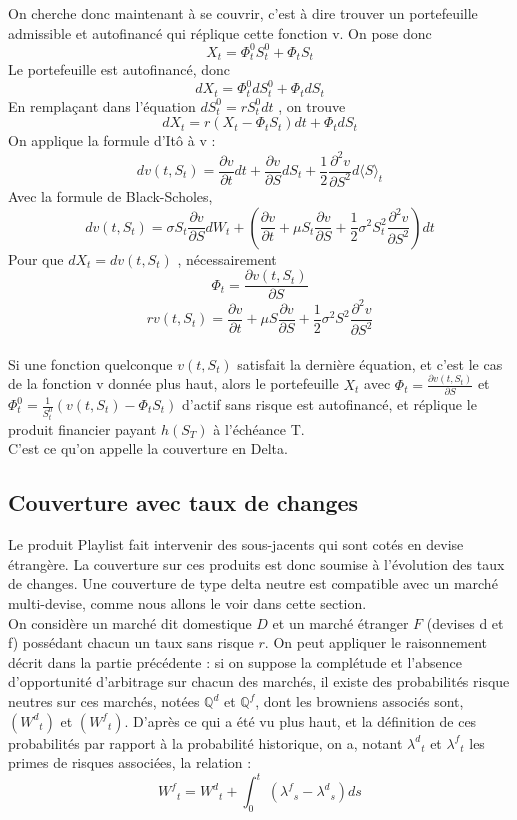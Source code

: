 \documentclass[french,12pt,a4paper]{article}
\begin{document}
\\ \\
On cherche donc maintenant à se couvrir, c'est à dire trouver un portefeuille admissible et autofinancé qui réplique cette fonction v. On pose donc
$$ X_t = \Phi_{t}^0 S_{t}^0  + \Phi_t S_{t}  $$
Le portefeuille est autofinancé, donc
$$ dX_t = \Phi_{t}^0 dS_{t}^0  + \Phi_t dS_{t} $$
En remplaçant dans l'équation $ dS_{t}^0 = r S_{t}^0 dt $ , on trouve
$$ dX_t = r(X_t - \Phi_t S_{t} )dt + \Phi_t dS_{t}  $$
On applique la formule d'Itô à v :
$$ dv(t,S_t) = \frac{\partial v}{\partial t}dt + \frac{\partial v}{\partial S}dS_t + \frac{1}{2} \frac{\partial^2 v}{\partial S^2} d \langle S \rangle_t   $$
Avec la formule de Black-Scholes,
$$ dv(t,S_t) = \sigma S_t \frac{\partial v}{\partial S} dW_t + \left (  \frac{\partial v}{\partial t} + \mu S_t   \frac{\partial v}{\partial S} +  \frac{1}{2} \sigma^2 S_{t}^2 \frac{\partial^2 v}{\partial S^2} \right ) dt	$$
Pour que $ dX_t = dv(t,S_t) $ , nécessairement
$$ \Phi_t = \frac{\partial v(t,S_t)}{\partial S} $$
$$ rv(t,S_t) = \frac{\partial v}{\partial t} + \mu S  \frac{\partial v}{\partial S} +  \frac{1}{2} \sigma^2 S^2 \frac{\partial^2 v}{\partial S^2} $$ \\
Si une fonction quelconque $ v(t,S_t) $ satisfait la dernière équation, et c'est le cas de la fonction v donnée plus haut, alors le portefeuille $ X_t $ avec $ \Phi_t = \frac{\partial v(t,S_t)}{\partial S} $ et $ \Phi_{t}^0  = \frac{1}{S_{t}^0} (v(t,S_t) - \Phi_t S_t )$ d'actif sans risque est autofinancé, et réplique le produit financier payant $ h(S_T) $ à l'échéance T.  \\
C'est ce qu'on appelle la couverture en Delta.

\subsection{Couverture avec taux de changes}

Le produit Playlist fait intervenir des sous-jacents qui sont cotés en devise étrangère. La couverture sur ces produits est donc soumise à l'évolution des taux de changes.
Une couverture de type delta neutre est compatible avec un marché multi-devise, comme nous allons le voir dans cette section.
\\
On considère un marché dit domestique $D$ et un marché étranger $F$ (devises d et f) possédant chacun un taux sans risque $r$. On peut appliquer le raisonnement décrit dans la partie précédente : si on suppose la complétude et l'absence d'opportunité d'arbitrage sur chacun des marchés, il existe des probabilités risque neutres sur ces marchés, notées $\mathbb{Q}^{d}$ et $\mathbb{Q}^{f}$, dont les browniens associés sont, $({W^{d}}_{t})$ et $({W^{f}}_{t})$.
D'après ce qui a été vu plus haut,  et la définition de ces probabilités par rapport à la probabilité historique, on a, notant ${\lambda^{d}}_{t}$ et ${\lambda^{f}}_{t}$ les primes de risques associées, la relation :
$${W^{f}}_{t} = {W^{d}}_{t} +  \int_{0}^t \ ({\lambda^{f}}_{s} - {\lambda^{d}}_{s}) ds   $$
\end{document}
